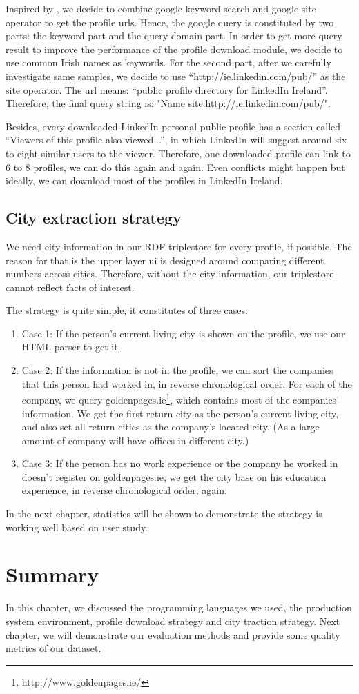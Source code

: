 Inspired by \cite{li2012}, we decide to combine google keyword search and google site operator to get the profile urls. Hence, the google query is constituted by two parts: the keyword part and the query domain part. In order to get more query result to improve the performance of the profile download module, we decide to use common Irish names as keywords. For the second part, after we carefully investigate same samples, we decide to use ``http://ie.linkedin.com/pub/'' as the site operator. The url means: ``public profile directory for LinkedIn Ireland''. Therefore, the final query string is: "{Name} site:http://ie.linkedin.com/pub/".

Besides, every downloaded LinkedIn personal public profile has a section called ``Viewers of this profile also viewed...'', in which LinkedIn will suggest around six to eight similar users to the viewer. Therefore, one downloaded profile can link to 6 to 8 profiles, we can do this again and again. Even conflicts might happen but ideally, we can download most of the profiles in LinkedIn Ireland.

\subsection{City extraction strategy}
We need city information in our RDF triplestore for every profile, if possible. The reason for that is the upper layer \acrlong{ui} is designed around comparing different numbers across cities. Therefore, without the city information, our triplestore cannot reflect facts of interest.

The strategy is quite simple, it constitutes of three cases:
\begin{enumerate}
	\item Case 1: If the person's current living city is shown on the profile, we use our HTML parser to get it.
	\item Case 2: If the information is not in the profile, we can sort the companies that this person had worked in, in reverse chronological order. For each of the company, we query goldenpages.ie\footnote{http://www.goldenpages.ie/}, which contains most of the companies' information. We get the first return city as the person's current living city, and also set all return cities as the company's located city. (As a large amount of company will have offices in different city.)
	\item Case 3: If the person has no work experience or the company he worked in doesn't register on goldenpages.ie, we get the city base on his education experience, in reverse chronological order, again.
\end{enumerate}

In the next chapter, statistics will be shown to demonstrate the strategy is working well based on user study.

\section{Summary}
In this chapter, we discussed the programming languages we used, the production system environment, profile download strategy and city traction strategy. Next chapter, we will demonstrate our evaluation methods and provide some quality metrics of our dataset.